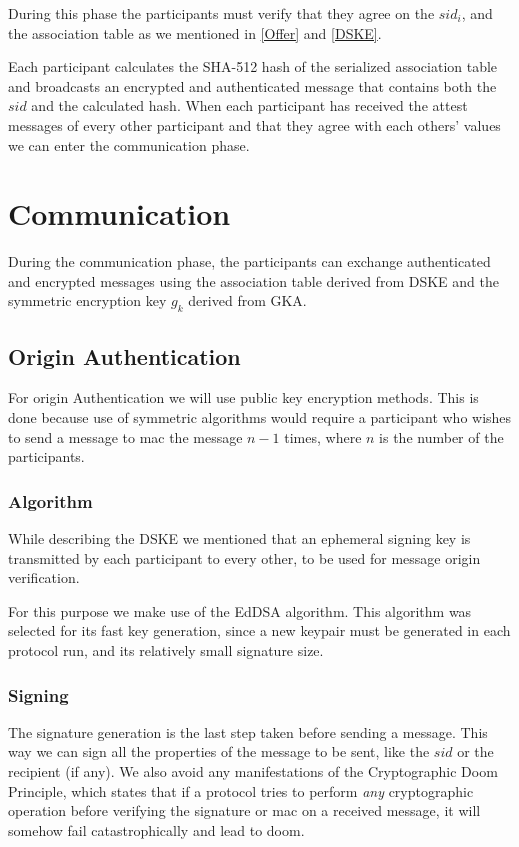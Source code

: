 \documentclass[12pt,titlepage,a4paper]{article}
\begin{document}
{During this phase the participants must verify that they agree on the $sid_i$,
and the association table as we mentioned in \ref{Offer} and \ref{DSKE}.

Each participant calculates the SHA-512 hash of the serialized association
table and broadcasts an encrypted and authenticated message that contains
both the $sid$ and the calculated hash. When each participant has received
the attest messages of every other participant and that they agree with each
others' values we can enter the communication phase.

\section{Communication}

During the communication phase, the participants can exchange authenticated
and encrypted messages using the association table derived from DSKE and the
symmetric encryption key $g_k$ derived from GKA.

\subsection{Origin Authentication}

For origin Authentication we will use public key encryption methods. This is
done because use of symmetric algorithms would require a participant who
wishes to send a message to mac the message $n-1$ times, where $n$ is the
number of the participants.

\subsubsection{Algorithm}

While describing the DSKE we mentioned that an ephemeral signing key is transmitted
by each participant to every other, to be used for message origin verification.

For this purpose we make use of the EdDSA algorithm. This algorithm was selected
for its fast key generation, since a new keypair must be generated in each protocol
run, and its relatively small signature size.

\subsubsection{Signing}

The signature generation is the last step taken before sending a message. This
way we can sign all the properties of the message to be sent, like the $sid$ or the
recipient (if any). We also avoid any manifestations of the Cryptographic Doom
Principle, which states that if a protocol tries to perform \emph{any}
cryptographic operation before verifying the signature or mac on a received
message, it will somehow fail catastrophically and lead to doom.

}
\end{document}
